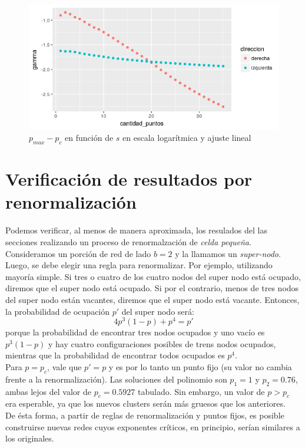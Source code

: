 \documentclass[%
 reprint,
 amsmath,amssymb,
 aps,
spanish]{revtex4-1}
\begin{document}
\begin{figure}[h]
  \centering
  \includegraphics[width=.9\linewidth]{ej6/gamma}
\caption{$p_{max}-p_c$ en función de $s$ en escala logarítmica y ajuste lineal}
\label{fig:6gamma}
\end{figure}

\section{\label{R} Verificaci\'on de resultados por renormalizaci\'on}

Podemos verificar, al menos de manera aproximada, los resulados del las secciones realizando un proceso de renormalzaci\'on de \emph{celda peque\~na}. Consideramos un porci\'on de red de lado $b=2$ y la llamamos un \emph{super-nodo}. Luego, se debe elegir una regla para renormalizar. Por ejemplo, utilizando mayoría simple. Si tres o cuatro de los cuatro nodos del super nodo está ocupado, diremos que el super nodo está ocupado. Si por el contrario, menos de tres nodos del super nodo están vacantes, diremos que el super nodo está vacante. Entonces, la probabilidad de ocupación $p'$ del super nodo será:
\begin{equation}
\label{ecu:renormalizacion_mayoria}
4p^3(1-p) + p^4 = p'
\end{equation} 
porque la probabilidad de encontrar tres nodos ocupados y uno vacío es $p^3(1-p)$ y hay cuatro configuraciones posibles de trens nodos ocupados, mientras que la probabilidad de encontrar todos ocupados es $p^4$.\\
Para $p=p_c$, vale que $p'=p$ y es por lo tanto un punto fijo (su valor no cambia frente a la renormalización). Las soluciones del polinomio son $p_1=1$ y $p_2=0.76$, ambas lejos del valor de $p_c=0.5927$ tabulado. Sin embargo, un valor de $p>p_c$ era esperable, ya que los nuevos clusters serán más gruesos que los anteriores.\\
De ésta forma, a partir de reglas de renormalización y puntos fijos, es posible construirse nuevas redes cuyos exponentes críticos, en principio, serían similares a los originales.
\end{document}
